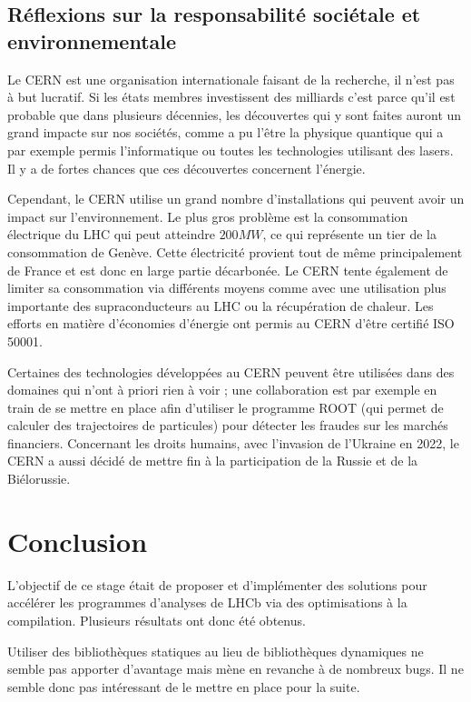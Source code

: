 \documentclass[a4paper]{report}
\begin{document}
\section{Réflexions sur la responsabilité sociétale et environnementale}
Le CERN est une organisation internationale faisant de la recherche, il n'est pas à but lucratif.
Si les états membres investissent des milliards c'est parce qu'il est probable que dans plusieurs décennies, les découvertes qui y sont faites auront un grand impacte sur nos sociétés,
comme a pu l'être la physique quantique qui a par exemple permis l'informatique ou toutes les technologies utilisant des lasers.
Il y a de fortes chances que ces découvertes concernent l'énergie.

Cependant, le CERN utilise un grand nombre d'installations qui peuvent avoir un impact sur l'environnement.
Le plus gros problème est la consommation électrique du LHC qui peut atteindre $200MW$, ce qui représente un tier de la consommation de Genève.
Cette électricité provient tout de même principalement de France et est donc en large partie décarbonée.
Le CERN tente également de limiter sa consommation via différents moyens comme avec une utilisation plus importante des supraconducteurs au LHC ou la récupération de chaleur.
Les efforts en matière d'économies d'énergie ont permis au CERN d'être certifié ISO 50001.

Certaines des technologies développées au CERN peuvent être utilisées dans des domaines qui n'ont à priori rien à voir ;
une collaboration est par exemple en train de se mettre en place afin d'utiliser le programme ROOT (qui permet de calculer des trajectoires de particules) pour détecter les fraudes sur les marchés financiers.
Concernant les droits humains, avec l'invasion de l'Ukraine en 2022, le CERN a aussi décidé de mettre fin à la participation de la Russie et de la Biélorussie.


\chapter*{Conclusion}
L'objectif de ce stage était de proposer et d'implémenter des solutions pour accélérer les programmes d'analyses de LHCb via des optimisations à la compilation.
Plusieurs résultats ont donc été obtenus.

Utiliser des bibliothèques statiques au lieu de bibliothèques dynamiques ne semble pas apporter d'avantage mais mène en revanche à de nombreux bugs.
Il ne semble donc pas intéressant de le mettre en place pour la suite.
\end{document}
